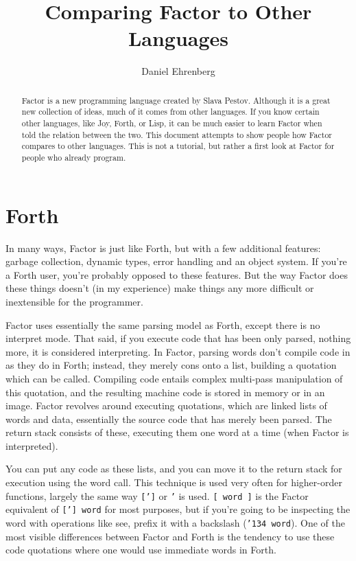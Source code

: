 \documentclass{article}
\author{Daniel Ehrenberg}
\title{Comparing Factor to Other Languages}
\begin{document}
\maketitle

\begin{abstract}
Factor is a new programming language created by Slava Pestov. Although it is a great new collection of ideas, much of it comes from other languages. If you know certain other languages, like Joy, Forth, or Lisp, it can be much easier to learn Factor when told the relation between the two. This document attempts to show people how Factor compares to other languages. This is not a tutorial, but rather a first look at Factor for people who already program.
\end{abstract}

\section{Forth}

In many ways, Factor is just like Forth, but with a few additional features: garbage collection, dynamic types, error handling and an object system. If you're a Forth user, you're probably opposed to these features. But the way Factor does these things doesn't (in my experience) make things any more difficult or inextensible for the programmer.

Factor uses essentially the same parsing model as Forth, except there is no interpret mode. That said, if you execute code that has been only parsed, nothing more, it is considered interpreting. In Factor, parsing words don't compile code in as they do in Forth; instead, they merely cons onto a list, building a quotation which can be called. Compiling code entails complex multi-pass manipulation of this quotation, and the resulting machine code is stored in memory or in an image. Factor revolves around executing quotations, which are linked lists of words and data, essentially the source code that has merely been parsed. The return stack consists of these, executing them one word at a time (when Factor is interpreted).

You can put any code as these lists, and you can move it to the return stack for execution using the word call. This technique is used very often for higher-order functions, largely the same way \texttt{[']} or \texttt{'} is used. \texttt{[ word ]} is the Factor equivalent of \texttt{['] word} for most purposes, but if you're going to be inspecting the word with operations like see, prefix it with a backslash (\texttt{\char'134 word}). One of the most visible differences between Factor and Forth is the tendency to use these code quotations where one would use immediate words in Forth.
\end{document}
